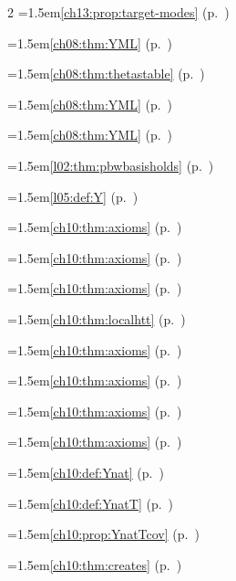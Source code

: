 \begin{multicols}{2}
\hangindent=1.5em\quad \ref{ch13:prop:target-modes} (p.~\pageref{ch13:prop:target-modes})\par
\hangindent=1.5em\quad \ref{ch08:thm:YML} (p.~\pageref{ch08:thm:YML})\par
\hangindent=1.5em\quad \ref{ch08:thm:thetastable} (p.~\pageref{ch08:thm:thetastable})\par
\hangindent=1.5em\quad \ref{ch08:thm:YML} (p.~\pageref{ch08:thm:YML})\par
\hangindent=1.5em\quad \ref{ch08:thm:YML} (p.~\pageref{ch08:thm:YML})\par
\hangindent=1.5em\quad \ref{l02:thm:pbwbasisholds} (p.~\pageref{l02:thm:pbwbasisholds})\par
\hangindent=1.5em\quad \ref{l05:def:Y} (p.~\pageref{l05:def:Y})\par
\hangindent=1.5em\quad \ref{ch10:thm:axioms} (p.~\pageref{ch10:thm:axioms})\par
\hangindent=1.5em\quad \ref{ch10:thm:axioms} (p.~\pageref{ch10:thm:axioms})\par
\hangindent=1.5em\quad \ref{ch10:thm:axioms} (p.~\pageref{ch10:thm:axioms})\par
\hangindent=1.5em\quad \ref{ch10:thm:localhtt} (p.~\pageref{ch10:thm:localhtt})\par
\hangindent=1.5em\quad \ref{ch10:thm:axioms} (p.~\pageref{ch10:thm:axioms})\par
\hangindent=1.5em\quad \ref{ch10:thm:axioms} (p.~\pageref{ch10:thm:axioms})\par
\hangindent=1.5em\quad \ref{ch10:thm:axioms} (p.~\pageref{ch10:thm:axioms})\par
\hangindent=1.5em\quad \ref{ch10:thm:axioms} (p.~\pageref{ch10:thm:axioms})\par
\hangindent=1.5em\quad \ref{ch10:def:Ynat} (p.~\pageref{ch10:def:Ynat})\par
\hangindent=1.5em\quad \ref{ch10:def:YnatT} (p.~\pageref{ch10:def:YnatT})\par
\hangindent=1.5em\quad \ref{ch10:prop:YnatTcov} (p.~\pageref{ch10:prop:YnatTcov})\par
\hangindent=1.5em\quad \ref{ch10:thm:creates} (p.~\pageref{ch10:thm:creates})\par

\end{multicols}
